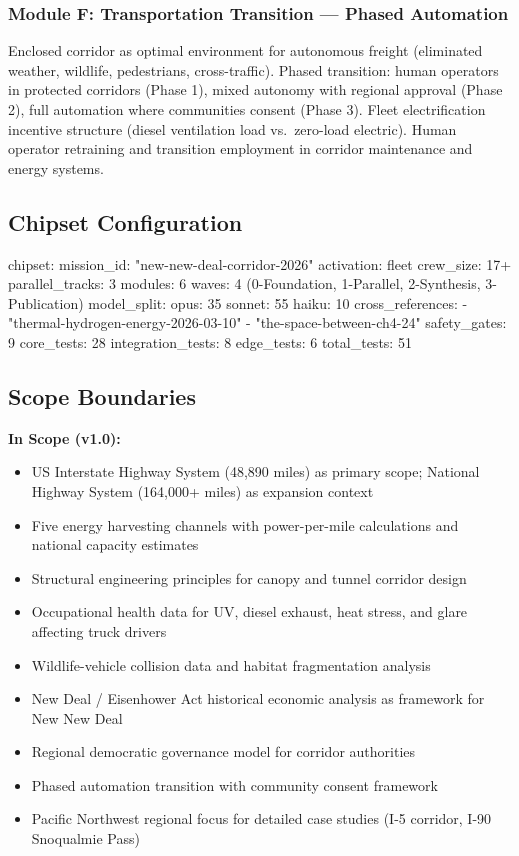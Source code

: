 \documentclass[11pt,letterpaper]{article}
\begin{document}
\subsubsection{Module F: Transportation Transition --- Phased Automation}
Enclosed corridor as optimal environment for autonomous freight (eliminated weather, wildlife, pedestrians, cross-traffic). Phased transition: human operators in protected corridors (Phase 1), mixed autonomy with regional approval (Phase 2), full automation where communities consent (Phase 3). Fleet electrification incentive structure (diesel ventilation load vs.\ zero-load electric). Human operator retraining and transition employment in corridor maintenance and energy systems.

\subsection{Chipset Configuration}

\begin{asciibox}
chipset:
  mission_id: "new-new-deal-corridor-2026"
  activation: fleet
  crew_size: 17+
  parallel_tracks: 3
  modules: 6
  waves: 4 (0-Foundation, 1-Parallel, 2-Synthesis, 3-Publication)
  model_split:
    opus: 35%
    sonnet: 55%
    haiku: 10%
  cross_references:
    - "thermal-hydrogen-energy-2026-03-10"
    - "the-space-between-ch4-24"
  safety_gates: 9
  core_tests: 28
  integration_tests: 8
  edge_tests: 6
  total_tests: 51
\end{asciibox}

\subsection{Scope Boundaries}

\textbf{In Scope (v1.0):}
\begin{itemize}[leftmargin=2em]
  \item US Interstate Highway System (48,890 miles) as primary scope; National Highway System (164,000+ miles) as expansion context
  \item Five energy harvesting channels with power-per-mile calculations and national capacity estimates
  \item Structural engineering principles for canopy and tunnel corridor design
  \item Occupational health data for UV, diesel exhaust, heat stress, and glare affecting truck drivers
  \item Wildlife-vehicle collision data and habitat fragmentation analysis
  \item New Deal / Eisenhower Act historical economic analysis as framework for New New Deal
  \item Regional democratic governance model for corridor authorities
  \item Phased automation transition with community consent framework
  \item Pacific Northwest regional focus for detailed case studies (I-5 corridor, I-90 Snoqualmie Pass)
\end{itemize}
\end{document}
